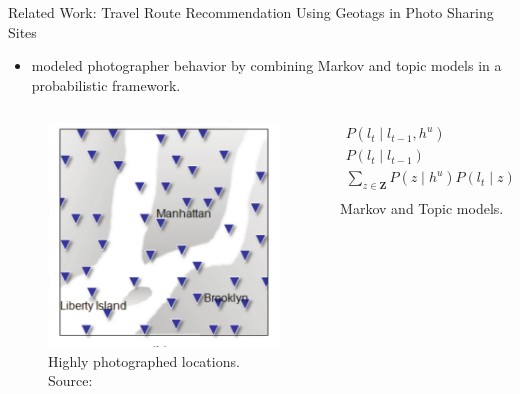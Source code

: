 \documentclass{beamer}
\begin{document}
\begin{frame}{Related Work: Travel Route Recommendation Using Geotags in Photo Sharing Sites}
  \begin{itemize}
    \item \citet{Kurashima2010} modeled photographer behavior by combining Markov and topic models in a probabilistic framework.
  \end{itemize}
  \begin{columns}
    \begin{column}{0.3\textwidth}
      \begin{figure}
        \centering
        \includegraphics[width=\textwidth]{kurashima1}
        \caption{Highly photographed locations. Source: \citet{Kurashima2010}}
      \end{figure}
    \end{column}
    \pause
    \begin{column}{0.3\textwidth}
      \begin{align*}
        P(l_{t} \mid l_{t-1}, h^{u}) \\
        P(l_{t} \mid l_{t-1}) \\
        \sum_{z \in \bm{Z}}P(z \mid h^{u})P(l_{t} \mid z) \\
      \end{align*}
      Markov and Topic models.
    \end{column}

\end{columns}
\end{frame}
\end{document}
